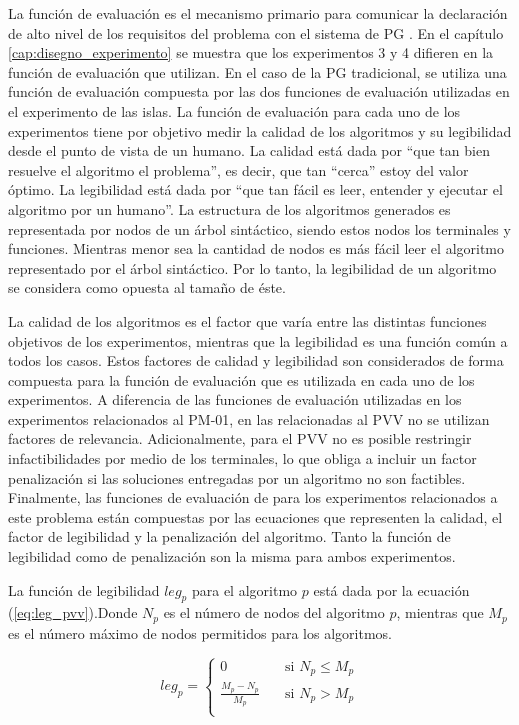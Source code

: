 La función de evaluación es el mecanismo primario para comunicar la declaración de alto nivel de los requisitos del problema con el sistema de PG \citep{koza_poli_2005}. En el capítulo \ref{cap:disegno_experimento} se muestra que los experimentos 3 y 4 difieren en la función de evaluación que utilizan. En el caso de la PG tradicional, se utiliza una función de evaluación compuesta por las dos funciones de evaluación utilizadas en el experimento de las islas. La función de evaluación para cada uno de los experimentos tiene por objetivo medir la calidad de los algoritmos y su legibilidad desde el punto de vista de un humano. La calidad está dada por “que tan bien resuelve el algoritmo el problema”, es decir, que tan “cerca” estoy del valor óptimo. La legibilidad está dada por “que tan fácil es leer, entender y ejecutar el algoritmo por un humano”. La estructura de los algoritmos generados es representada por nodos de un árbol sintáctico, siendo estos nodos los terminales y funciones. Mientras menor sea la cantidad de nodos es más fácil leer el algoritmo representado por el árbol sintáctico. Por lo tanto, la legibilidad de un algoritmo se considera como opuesta al tamaño de éste.

La calidad de los algoritmos es el factor que varía entre las distintas funciones objetivos de los experimentos, mientras que la legibilidad es una función común a todos los casos. Estos factores de calidad y legibilidad son considerados de forma compuesta para la función de evaluación que es utilizada en cada uno de los experimentos. A diferencia de las funciones de evaluación utilizadas en los experimentos relacionados al PM-01, en las relacionadas al PVV no se utilizan factores de relevancia. Adicionalmente, para el PVV no es posible restringir infactibilidades por medio de los terminales, lo que obliga a incluir un factor penalización si las soluciones entregadas por un algoritmo no son factibles. Finalmente, las funciones de evaluación de para los experimentos relacionados a este problema están compuestas por las ecuaciones que representen la calidad, el factor de legibilidad y la penalización del algoritmo. Tanto la función de legibilidad como de penalización son la misma para ambos experimentos.

La función de legibilidad $leg_{p}$ para el algoritmo $p$ está dada por la ecuación (\ref{eq:leg_pvv}).Donde $N_{p}$ es el número de nodos del algoritmo $p$, mientras que $M_{p}$ es el número máximo de nodos permitidos para los algoritmos.

\begin{equation}
\label{eq:leg_pvv}
	leg_{p} = 	\begin{cases}
					0       & \quad \text{si } N_{p} \leq M_{p} \\
					\frac{M_{p}-N_{p}}{M_{p}}  & \quad \text{si } N_{p} > M_{p}\\
				\end{cases}
\end{equation}

